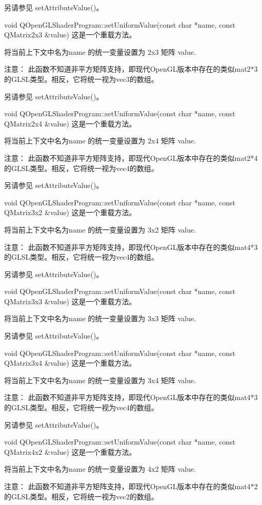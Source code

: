 另请参见 setAttributeValue()。

void QOpenGLShaderProgram::setUniformValue(const char *name, const QMatrix2x3 \&value)
这是一个重载方法。

将当前上下文中名为name 的统一变量设置为 2x3 矩阵 value.

注意： 此函数不知道非平方矩阵支持，即现代OpenGL版本中存在的类似mat2*3的GLSL类型。相反，它将统一视为vec3的数组。

另请参见 setAttributeValue()。

void QOpenGLShaderProgram::setUniformValue(const char *name, const QMatrix2x4 \&value)
这是一个重载方法。

将当前上下文中名为name 的统一变量设置为 2x4 矩阵 value.

注意： 此函数不知道非平方矩阵支持，即现代OpenGL版本中存在的类似mat2*4的GLSL类型。相反，它将统一视为vec4的数组。

另请参见 setAttributeValue()。

void QOpenGLShaderProgram::setUniformValue(const char *name, const QMatrix3x2 \&value)
这是一个重载方法。

将当前上下文中名为name 的统一变量设置为 3x2 矩阵 value.

注意： 此函数不知道非平方矩阵支持，即现代OpenGL版本中存在的类似mat4*3的GLSL类型。相反，它将统一视为vec4的数组。

另请参见 setAttributeValue()。

void QOpenGLShaderProgram::setUniformValue(const char *name, const QMatrix3x3 \&value)
这是一个重载方法。

将当前上下文中名为name 的统一变量设置为 3x3 矩阵 value.

另请参见 setAttributeValue()。

void QOpenGLShaderProgram::setUniformValue(const char *name, const QMatrix3x4 \&value)
这是一个重载方法。

将当前上下文中名为name 的统一变量设置为 3x4 矩阵 value.

注意： 此函数不知道非平方矩阵支持，即现代OpenGL版本中存在的类似mat4*3的GLSL类型。相反，它将统一视为vec4的数组。

另请参见 setAttributeValue()。

void QOpenGLShaderProgram::setUniformValue(const char *name, const QMatrix4x2 \&value)
这是一个重载方法。

将当前上下文中名为name 的统一变量设置为 4x2 矩阵 value.

注意： 此函数不知道非平方矩阵支持，即现代OpenGL版本中存在的类似mat4*2的GLSL类型。相反，它将统一视为vec2的数组。

